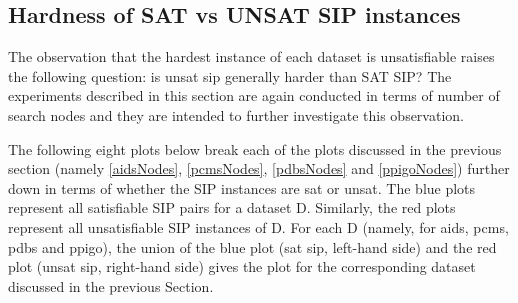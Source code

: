 \documentclass{l4proj}
\begin{document}
\subsection{Hardness of SAT vs UNSAT SIP instances}

The observation that the hardest instance of each dataset is unsatisfiable raises the following question: is \gls{unsat} \gls{sip} generally harder than SAT SIP? The experiments described in this section are again conducted in terms of number of search nodes and they are intended to further investigate this observation.

The following eight plots below break each of the plots discussed in the previous section (namely \ref{aidsNodes}, \ref{pcmsNodes}, \ref{pdbsNodes} and \ref{ppigoNodes}) further down in terms of whether the SIP instances are \gls{sat} or \gls{unsat}. The blue plots represent all satisfiable SIP pairs for a dataset D. Similarly, the red plots represent all unsatisfiable SIP instances of D. For each D (namely, for aids, pcms, pdbs and ppigo), the union of the blue plot (\gls{sat} \gls{sip}, left-hand side) and the red plot (\gls{unsat} \gls{sip}, right-hand side) gives the plot for the corresponding dataset discussed in the previous Section.
\end{document}
